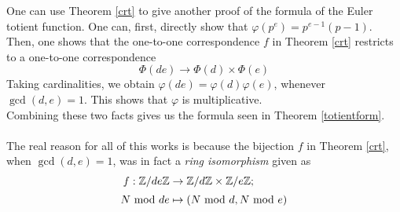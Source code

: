 \vspace*{1em}

\begin{remark}
One can use Theorem \ref{crt} to give another proof of the formula of the Euler totient function. One can, first, directly show that $\varphi(p^e) = p^{e-1}(p-1)$. Then, one shows that the one-to-one correspondence $f$ in Theorem \ref{crt} restricts to a one-to-one correspondence
\[\Phi(de) \to \Phi(d) \times \Phi(e)\]
Taking cardinalities, we obtain $\varphi(de) = \varphi(d)\varphi(e)$, whenever $\gcd(d,e)=1$. This shows that $\varphi$ is multiplicative.\\[1em]
Combining these two facts gives us the formula seen in Theorem \ref{totientform}.\\
\\
The real reason for all of this works is because the bijection $f$ in Theorem \ref{crt}, when $\gcd(d,e)=1$, was in fact a \emph{ring isomorphism} given as
\begin{align*}
f: \mathbb Z/de\mathbb Z &\to \mathbb Z/d\mathbb Z \times \mathbb Z/e\mathbb Z;\\[0.2em]
N\text{ mod }{de}&\mapsto (N\text{ mod }{d},N\text{ mod }{e})
\end{align*}
\end{remark}


